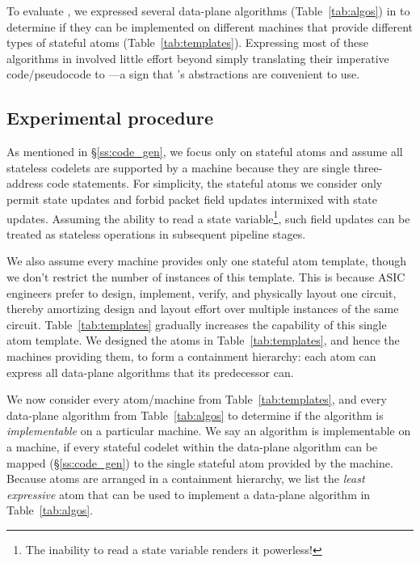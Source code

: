 To evaluate \pktlanguage, we expressed several data-plane algorithms
(Table~\ref{tab:algos}) in \pktlanguage to determine if they can be implemented
on different \absmachine machines that provide different types of stateful
atoms (Table~\ref{tab:templates}). Expressing most of these algorithms in
\pktlanguage involved little effort beyond simply translating their imperative
code/pseudocode to \pktlanguage---a sign that \pktlanguage's abstractions are
convenient to use.

\subsection{Experimental procedure}
As mentioned in \S\ref{ss:code_gen}, we focus only on stateful atoms and assume
all stateless codelets are supported by a \absmachine machine because they are
single three-address code statements. For simplicity, the stateful atoms we consider
only permit state updates and forbid packet field updates intermixed with state
updates.  Assuming the ability to read a state variable\footnote{The inability
to read a state variable renders it powerless!}, such field updates can be
treated as stateless operations in subsequent pipeline stages.

We also assume every \absmachine machine provides only one stateful atom
template, though we don't restrict the number of instances of this template.
This is because ASIC engineers prefer to design, implement, verify, and
physically layout one circuit, thereby amortizing design and layout effort over
multiple instances of the same circuit.  Table~\ref{tab:templates} gradually
increases the capability of this single atom template.  We designed the atoms
in Table~\ref{tab:templates}, and hence the \absmachine machines providing
them, to form a containment hierarchy: each atom can express all data-plane
algorithms that its predecessor can.

We now consider every atom/\absmachine machine from Table~\ref{tab:templates},
and every data-plane algorithm from Table~\ref{tab:algos} to determine if the
algorithm is \textit{implementable} on a particular \absmachine machine. We say
an algorithm is implementable on a \absmachine machine, if every stateful
codelet within the data-plane algorithm can be mapped (\S\ref{ss:code_gen}) to
the single stateful atom provided by the \absmachine machine. Because
atoms are arranged in a containment hierarchy, we list the \textit{least
expressive} atom that can be used to implement a data-plane algorithm in
Table~\ref{tab:algos}.

